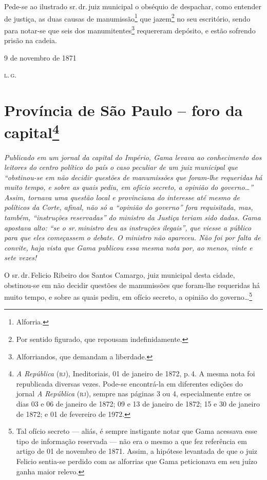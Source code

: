 Pede-se ao ilustrado sr.\,dr.\,juiz municipal o obséquio de despachar,
como entender de justiça, as duas causas de manumissão\footnote{
  Alforria.} que jazem\footnote{ Por sentido figurado, que repousam
  indefinidamente.} no seu escritório, sendo para notar-se que seis dos
manumitentes\footnote{ Alforriandos, que demandam a liberdade.}
requereram depósito, e estão sofrendo prisão na cadeia.

\begin{flushright}
9 de novembro de 1871

\textsc{l.\,g.}
\end{flushright}

\chapter{Província de São Paulo -- foro da capital\footnote{\emph{A República} (\textsc{rj}), Ineditoriais, 01 de janeiro de 1872, p.\,4.
  A mesma nota foi republicada diversas vezes. Pode-se encontrá-la em
  diferentes edições do jornal \emph{A República} (\textsc{rj}), sempre nas
  páginas 3 ou 4, especialmente entre os dias 03 e 06 de janeiro de 1872; 09 e 13 de janeiro de 1872; 15 e 30 de janeiro de 1872; e 01 de fevereiro de 1972.}} %

\begin{didascalia}
\emph{Publicado em um jornal da capital do Império, Gama levava ao
conhecimento dos leitores do centro político do país o caso peculiar de
um juiz municipal que ``obstinou-se em não decidir questões de
manumissões que foram-lhe requeridas há muito tempo, e sobre as quais
pediu, em ofício secreto, a opinião do governo\ldots{}'' Assim, tornava uma
questão local e provinciana do interesse até mesmo de políticos da
Corte, afinal, não só a ``opinião do governo'' fora requisitada, mas,
também, ``instruções reservadas'' do ministro da Justiça teriam sido
dadas. Gama apostava alto: ``se o sr.\,ministro deu as instruções
ilegais'', que viesse a público para que eles começassem o debate. O
ministro não apareceu. Não foi por falta de convite, haja vista que Gama
publicou essa mesma nota por, ao menos, vinte e sete vezes!}
\end{didascalia}

O sr.\,dr.\,Felicio Ribeiro dos Santos Camargo, juiz municipal desta
cidade, obstinou-se em não decidir questões de manumissões que foram-lhe
requeridas há muito tempo, e sobre as quais pediu, em ofício secreto, a
opinião do governo\ldots{}\footnote{ Tal ofício secreto --- aliás, é sempre
  instigante notar que Gama acessava esse tipo de informação reservada
  --- não era o mesmo a que fez referência em artigo de 01 de novembro de 1871.
  Assim, a hipótese levantada de que o juiz Felicio sentia-se perdido
  com as alforrias que Gama peticionava em seu juízo ganha maior relevo.}


